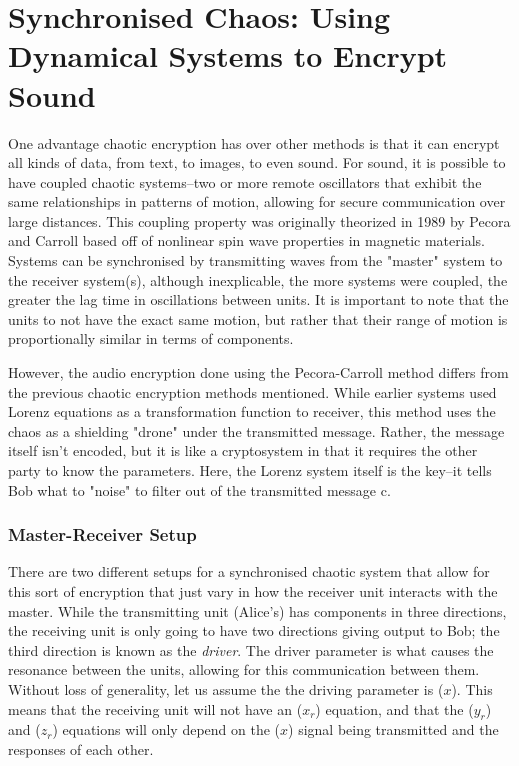 \chapter{Synchronised Chaos:  Using Dynamical Systems to Encrypt Sound}

One advantage chaotic encryption has over other methods is that it can encrypt all kinds of data, from text, to images, to even sound. For sound, it is possible to have coupled chaotic systems--two or more remote oscillators that exhibit the same relationships in patterns of motion, allowing for secure communication over large distances.  This coupling property was originally theorized in 1989 by Pecora and Carroll based off of nonlinear spin wave properties in magnetic materials.  Systems can be synchronised by transmitting waves from the "master" system to the receiver system(s), although inexplicable, the more systems were coupled, the greater the lag time in oscillations between units.  It is important to note that the units to not have the exact same motion, but rather that their range of motion is proportionally similar in terms of components. 

However, the audio encryption done using the Pecora-Carroll method differs from the previous chaotic encryption methods mentioned.  While earlier systems used Lorenz equations as a transformation function to receiver, this method uses the chaos as a shielding "drone" under the transmitted message.  Rather, the message itself isn't encoded, but it is like a cryptosystem in that it requires the other party to know the parameters.  Here, the Lorenz system itself is the key--it tells Bob what to "noise" to filter out of the transmitted message c.


\subsection{Master-Receiver Setup}

There are two different setups for a synchronised chaotic system that allow for this sort of encryption that just vary in how the receiver unit interacts with the master.  While the transmitting unit (Alice's) has components in three directions, the receiving unit  is only going to have two directions giving output to Bob; the third direction is known as the \textit{driver}.  The driver parameter is what causes the resonance between the units, allowing for this communication between them.  Without loss of generality, let us assume the the driving parameter is ($x$).  This means that the receiving unit will not have an ($x_{r}$) equation, and that the ($y_{r}$) and ($z_{r}$) equations will only depend on the ($x$) signal being transmitted and the responses of each other.


